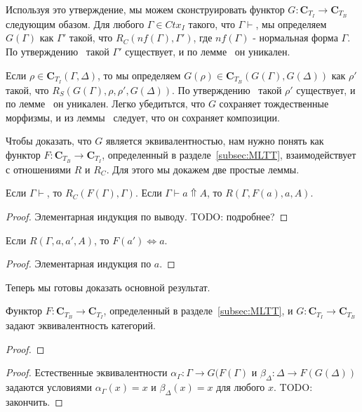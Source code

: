 \documentclass{amsart}
\theoremstyle{definition}
\theoremstyle{remark}
\newcommand{\deq}{\Leftrightarrow}
\newcommand{\cat}[1]{\mathbf{#1}}
\renewcommand{\C}{\cat{C}}
\numberwithin{figure}{section}
\begin{document}
Используя это утверждение, мы можем сконструировать функтор $G : \C_{T_I} \to \C_{T_B}$ следующим обазом.
Для любого $\Gamma \in Ctx_I$ такого, что $\Gamma \vdash$, мы определяем $G(\Gamma)$ как $\Gamma'$ такой, что $R_C(nf(\Gamma), \Gamma')$, где $nf(\Gamma)$ - нормальная форма $\Gamma$.
По утверждению~ такой $\Gamma'$ существует, и по лемме~ он уникален.

Если $\rho \in \C_{T_I}(\Gamma, \Delta)$, то мы определяем $G(\rho) \in \C_{T_B}(G(\Gamma), G(\Delta))$ как $\rho'$ такой, что $R_S(G(\Gamma), \rho, \rho', G(\Delta))$.
По утверждению~ такой $\rho'$ существует, и по лемме~ он уникален.
Легко убедитьтся, что $G$ сохраняет тождественные морфизмы, и из леммы~ следует, что он сохраняет композиции.

Чтобы доказать, что $G$ является эквивалентностью, нам нужно понять как функтор $F : \C_{T_B} \to \C_{T_I}$, определенный в разделе~\ref{subsec:MLTT}, взаимодействует с отношениями $R$ и $R_C$.
Для этого мы докажем две простые леммы.
\begin{lem}
Если $\Gamma \vdash$, то $R_C(F(\Gamma), \Gamma)$.
Если $\Gamma \vdash a \Uparrow A$, то $R(\Gamma, F(a), a, A)$.
\end{lem}
\begin{proof}
Элементарная индукция по выводу.
TODO: подробнее?
\end{proof}

\begin{lem}
Если $R(\Gamma, a, a', A)$, то $F(a') \deq a$.
\end{lem}
\begin{proof}
Элементарная индукция по $a$.
\end{proof}

Теперь мы готовы доказать основной результат.
\begin{thm}[equiv]
Функтор $F : \C_{T_B} \to \C_{T_I}$, определенный в разделе~\ref{subsec:MLTT}, и $G : \C_{T_I} \to \C_{T_B}$ задают эквивалентность категорий.
\end{thm}
\begin{proof}
\end{proof}
\begin{proof}
Естественные эквивалентности $\alpha_\Gamma : \Gamma \to G(F(\Gamma)$ и $\beta_\Delta : \Delta \to F(G(\Delta))$ задаются условиями $\alpha_\Gamma(x) = x$ и $\beta_\Delta(x) = x$ для любого $x$.
TODO: закончить.
\end{proof}



\end{document}

